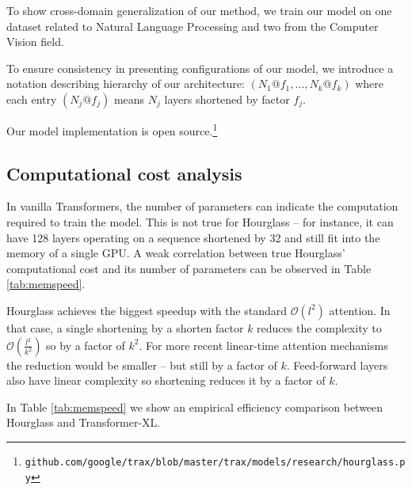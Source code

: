 \documentclass[11pt]{article}
\begin{document}
To show cross-domain generalization of our method, we train our model on one dataset related to Natural Language Processing and two from the Computer Vision field.

To ensure consistency in presenting configurations of our model, we introduce a notation describing hierarchy of our architecture: $(N_1@f_1, \dots, N_k@f_k)$ where each entry $(N_j@f_j)$ means $N_j$ layers shortened by factor $f_j$. 

\renewcommand{\footnotesize}{\fontsize{5pt}{11pt}\selectfont} 
Our model implementation is open source.\footnote{\texttt{github.com/google/trax/blob/master/trax/models/research/hourglass.py}}

\subsection{Computational cost analysis}\label{sec:cost}
In vanilla Transformers, the number of parameters can indicate the computation required to train the model. This is not true for Hourglass -- for instance, it can have 128 layers operating on a sequence shortened by 32 and still fit into the memory of a single GPU. A weak correlation between true Hourglass' computational cost and its number of parameters can be observed in Table \ref{tab:memspeed}.

Hourglass achieves the biggest speedup with the standard $\mathcal{O}(l^2)$ attention. In that case, a single shortening by a shorten factor $k$ reduces the complexity to $\mathcal{O}(\frac{l^2}{k^2})$ so by a factor of $k^2$.
For more recent linear-time attention mechanisms \cite{katharopoulos2020transformers, choromanski2021rethinking}
the reduction would be smaller -- but still by a factor of $k$.
Feed-forward layers also have linear complexity so shortening
reduces it by a factor of $k$. 

In Table \ref{tab:memspeed} we show an empirical efficiency comparison between
Hourglass and Transformer-XL.
\end{document}
